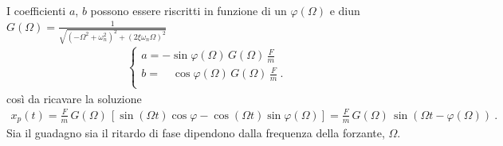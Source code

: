 \documentclass[letterpaper,10pt,italian]{jupyterBook}
\begin{document}
\sphinxAtStartPar
I coefficienti \(a\), \(b\) possono essere riscritti in funzione di un  \(\varphi(\Omega)\) e diun  \(G(\Omega) = \frac{1}{\sqrt{(-\Omega^2+\omega_n^2)^2 + (2 \xi \omega_n \Omega)^2}}\)
\begin{equation*}
\begin{split}
\begin{cases}
 a =       - \sin \varphi(\Omega) \, G(\Omega) \, \frac{F}{m} \\
 b = \quad   \cos \varphi(\Omega) \, G(\Omega) \, \frac{F}{m} \ .\\
\end{cases} 
\end{split}
\end{equation*}
\sphinxAtStartPar
così da ricavare la soluzione
\begin{equation*}
\begin{split}x_p(t)
  = \frac{F}{m} \, G(\Omega) \, \left[ \sin(\Omega t) \cos \varphi - \cos(\Omega t) \sin \varphi(\Omega) \right] 
  = \frac{F}{m} \, G(\Omega) \, \sin(\Omega t - \varphi(\Omega)) \ .
\end{split}
\end{equation*}
\sphinxAtStartPar
Sia il guadagno sia il ritardo di fase dipendono dalla frequenza della forzante, \(\Omega\).
\end{document}
